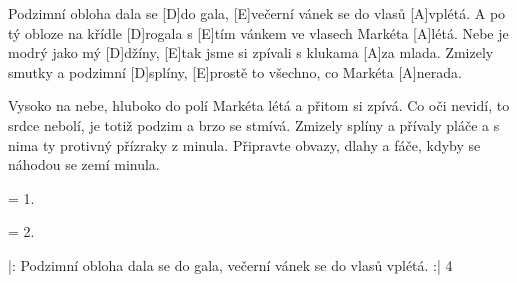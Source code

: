 
\sloka
[A]Podzimní obloha dala se [D]do gala,
[E]večerní vánek se do vlasů [A]vplétá.
A po tý obloze na křídle [D]rogala
s [E]tím vánkem ve vlasech Markéta [A]létá.
Nebe je modrý jako mý [D]džíny,
[E]tak jsme si zpívali s klukama [A]za mlada.
Zmizely smutky a podzimní [D]splíny,
[E]prostě to všechno, co Markéta [A]nerada.

\sloka
Vysoko na nebe, hluboko do polí
Markéta létá a přitom si zpívá.
Co oči nevidí, to srdce nebolí,
je totiž podzim a brzo se stmívá.
Zmizely splíny a přívaly pláče
a s nima ty protivný přízraky z minula.
Připravte obvazy, dlahy a fáče,
kdyby se náhodou se zemí minula.

\sloka
= 1.

\sloka
= 2.

\sloka
|: Podzimní obloha dala se do gala,
večerní vánek se do vlasů vplétá. :| 4\x
